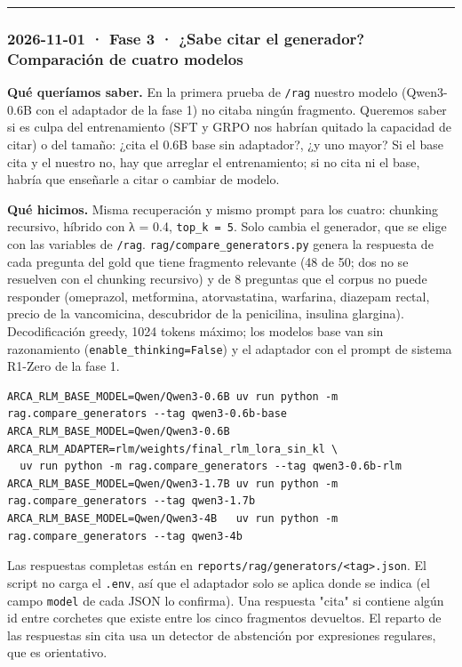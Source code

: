 \begin{center}\rule{0.5\linewidth}{0.5pt}\end{center}

\subsubsection{2026-11-01 · Fase 3 · ¿Sabe citar el generador? Comparación de cuatro modelos}

\textbf{Qué queríamos saber.} En la primera prueba de \texttt{/\allowbreak{}rag} nuestro modelo (Qwen3-0.6B con el adaptador
de la fase 1) no citaba ningún fragmento. Queremos saber si es culpa del entrenamiento (SFT y GRPO
nos habrían quitado la capacidad de citar) o del tamaño: ¿cita el 0.6B base sin adaptador?, ¿y
uno mayor? Si el base cita y el nuestro no, hay que arreglar el entrenamiento; si no cita ni el
base, habría que enseñarle a citar o cambiar de modelo.

\textbf{Qué hicimos.} Misma recuperación y mismo prompt para los cuatro: chunking recursivo, híbrido
con λ = 0.4, \texttt{top\_\allowbreak{}k =\allowbreak{} 5}. Solo cambia el generador, que se elige con las variables de \texttt{/\allowbreak{}rag}.
\texttt{rag/\allowbreak{}compare\_\allowbreak{}generators.py} genera la respuesta de cada pregunta del gold que tiene fragmento
relevante (48 de 50; dos no se resuelven con el chunking recursivo) y de 8 preguntas que el
corpus no puede responder (omeprazol, metformina, atorvastatina, warfarina, diazepam rectal,
precio de la vancomicina, descubridor de la penicilina, insulina glargina). Decodificación
greedy, 1024 tokens máximo; los modelos base van sin razonamiento (\texttt{enable\_\allowbreak{}thinking=\allowbreak{}False}) y el
adaptador con el prompt de sistema R1-Zero de la fase 1.

\begin{lstlisting}
ARCA_RLM_BASE_MODEL=Qwen/Qwen3-0.6B uv run python -m rag.compare_generators --tag qwen3-0.6b-base
ARCA_RLM_BASE_MODEL=Qwen/Qwen3-0.6B ARCA_RLM_ADAPTER=rlm/weights/final_rlm_lora_sin_kl \
  uv run python -m rag.compare_generators --tag qwen3-0.6b-rlm
ARCA_RLM_BASE_MODEL=Qwen/Qwen3-1.7B uv run python -m rag.compare_generators --tag qwen3-1.7b
ARCA_RLM_BASE_MODEL=Qwen/Qwen3-4B   uv run python -m rag.compare_generators --tag qwen3-4b
\end{lstlisting}

Las respuestas completas están en \texttt{reports/\allowbreak{}rag/\allowbreak{}generators/\allowbreak{}\textless{}tag\textgreater{}.json}. El script no carga el
\texttt{.env}, así que el adaptador solo se aplica donde se indica (el campo \texttt{model} de cada JSON lo
confirma). Una respuesta "cita" si contiene algún id entre corchetes que existe entre los cinco
fragmentos devueltos. El reparto de las respuestas sin cita usa un detector de abstención por
expresiones regulares, que es orientativo.

